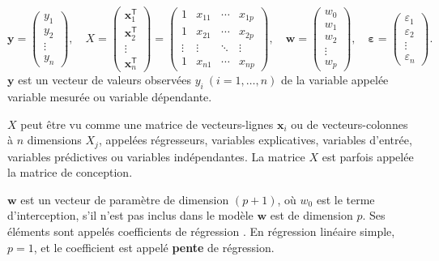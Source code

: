	$
	\mathbf{y} ={\begin{pmatrix}y_{1}\\y_{2}\\\vdots \\y_{n}\end{pmatrix}},\quad
	{\displaystyle 
		X={
			\begin{pmatrix}
			\mathbf {x} _{1}^{\mathsf {T}}\\
			\mathbf {x} _{2}^{\mathsf {T}}\\
			\vdots \\
			\mathbf {x} _{n}^{\mathsf {T}}
			\end{pmatrix}}={
			\begin{pmatrix}
			1&x_{11}&\cdots &x_{1p}\\
			1&x_{21} &\cdots &x_{2p}\\
			\vdots &\vdots &\ddots &\vdots \\
			1&x_{n1}&\cdots &x_{np}
			\end{pmatrix}},} \quad
	{\displaystyle {\boldsymbol {\boldsymbol{w}}}={
			\begin{pmatrix}
			w _{0}\\
			w _{1}\\
			w _{2}\\
			\vdots \\
			w _{p}
			\end{pmatrix}},\quad 
		{\boldsymbol {\varepsilon }}={
			\begin{pmatrix}\varepsilon _{1}\\
			\varepsilon _{2}\\
			\vdots \\
			\varepsilon _{ n}
			\end{pmatrix}}.}$ \\
	
	$\mathbf{y}$ est un vecteur de valeurs observées ${\displaystyle y_{i}\ (i=1,\ldots ,n)}$ de la variable appelée variable mesurée ou variable dépendante.
	
	$X$ peut être vu comme une matrice de vecteurs-lignes $\mathbf {x} _{i}$ ou de vecteurs-colonnes à $n$ dimensions $X_{j}$, appelées régresseurs, variables explicatives, variables d'entrée, variables prédictives ou variables indépendantes. La matrice $X$ est parfois appelée la matrice de conception. 
	
	${\boldsymbol {w}}$ est un vecteur de paramètre de dimension $(p+1)$, où $w _{0}$ est le terme d'interception, s'il n'est pas inclus dans le modèle ${\boldsymbol {w}}$ est de dimension $p$. Ses éléments sont appelés coefficients de régression \cite{antoine2018apprentissage}. 
	En régression linéaire simple, $p = 1$, et le coefficient est appelé \textbf{pente} de régression.
	
